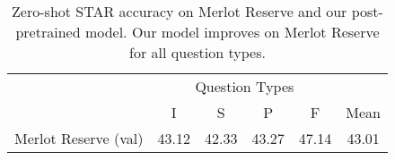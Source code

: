 \begin{table}[t]
	\centering
	\caption{Zero-shot STAR accuracy on Merlot Reserve and our post-pretrained
	model. Our model improves on Merlot Reserve for all question types.}
	\label{tab:star_ppt}
	\begin{tabular}{lccccc}
        \toprule
        \multicolumn{1}{c}{}        & \multicolumn{4}{c}{Question Types}        & \multicolumn{1}{c}{} \\
                                      \cmidrule(){2-5}
                                    & I           & S        & P          & F           & Mean \\
        \cmidrule(r){1-1}             \cmidrule(){2-5}                          \cmidrule(l){6-6}
    Merlot Reserve (val)        & 43.12       & 42.33    & 43.27      & 47.14       & 43.01\\

\end{tabular}
\end{table}
